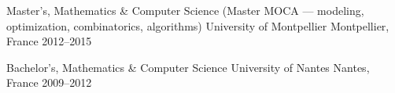 

\begin{cventries}

  \cventry
    {Master's, Mathematics \& Computer Science (Master MOCA --- modeling, optimization, combinatorics, algorithms)} %
    {University of Montpellier} %
    {Montpellier, France} %
    {2012--2015} %
    {}

  \cventry
    {Bachelor's, Mathematics \& Computer Science} %
    {University of Nantes} %
    {Nantes, France} %
    {2009--2012} %
    {}

\end{cventries}
